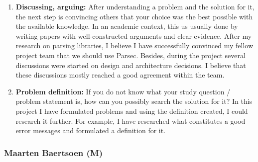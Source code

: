 \begin{enumerate}
    \item \textbf{Discussing, arguing:}
        After understanding a problem and the solution for it, the next step is convincing others that your choice was the best possible with the available knowledge.
        In an academic context, this us usually done by writing papers with well-constructed arguments and clear evidence.
        After my research on parsing libraries, I believe I have successfully convinced my fellow project team that we should use Parsec.
        Besides, during the project several discussions were started on design and architecture decisions.
        I believe that these discussions mostly reached a good agreement within the team.

    \item \textbf{Problem definition:}
        If you do not know what your study question / problem statement is, how can you possibly search the solution for it?
        In this project I have formulated problems and using the definition created, I could research it further.
        For example, I have researched what constitutes a good error messages and formulated a definition for it.
\end{enumerate}

\subsubsection{Maarten Baertsoen (M)}
